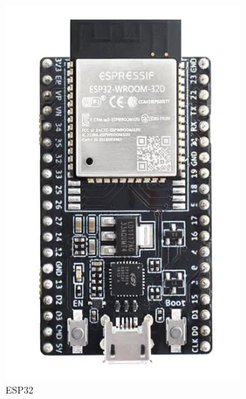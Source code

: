 \documentclass[scheme=chinese,a4paper]{article}
\begin{document}
\begin{figure}[H]
  \begin{subfigure}[t]{0.25\textwidth}
    \includegraphics[width=\textwidth]{ESP3.png}
    \caption{ESP32}
  \end{subfigure}
  \begin{subfigure}[t]{0.45\textwidth}

\end{subfigure}
\end{figure}
\end{document}
